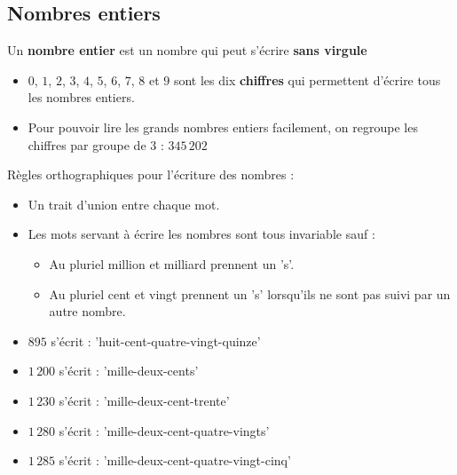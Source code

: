 \begin{pageCours} 


\section{Nombres entiers}

\begin{Def}
Un \textbf{nombre entier} est un nombre qui peut s'écrire \textbf{sans virgule}
\end{Def}

\begin{Rqs}
\begin{itemize}
\item $0$, $1$, $2$, $3$, $4$, $5$, $6$, $7$, $8$ et $9$ sont les dix \textbf{chiffres} qui permettent d'écrire tous les nombres entiers.
\item Pour pouvoir lire les grands nombres entiers facilement, on regroupe les chiffres par groupe de 3 : $345\,202$
\end{itemize}
\end{Rqs}

\begin{Reg}
Règles orthographiques pour l'écriture des nombres :
\begin{itemize}
    \item Un trait d'union entre chaque mot.
    \item Les mots servant à écrire les nombres sont tous invariable sauf :
    \begin{itemize}
        \item Au pluriel million et milliard prennent un 's'.
        \item Au pluriel cent et vingt prennent un 's' lorsqu'ils ne sont pas suivi par un autre nombre.
    \end{itemize}
\end{itemize}
\end{Reg}

\begin{Ex}
\begin{itemize}
\item $895$ s'écrit : 'huit-cent-quatre-vingt-quinze'
\item $1\,200$ s'écrit : 'mille-deux-cents'
\item $1\,230$ s'écrit : 'mille-deux-cent-trente'
\item $1\,280$ s'écrit : 'mille-deux-cent-quatre-vingts'
\item $1\,285$ s'écrit : 'mille-deux-cent-quatre-vingt-cinq'
\end{itemize}
\end{Ex}


\end{pageCours}
